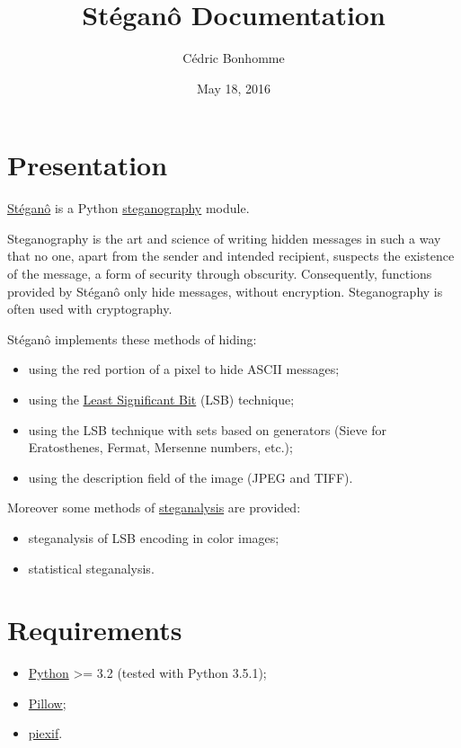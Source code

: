 \documentclass[letterpaper,10pt,english]{sphinxmanual}
\title{Stéganô Documentation}
\date{May 18, 2016}
\author{Cédric Bonhomme}
\begin{document}
\maketitle
\tableofcontents
{}\label{index::doc}



\chapter{Presentation}
\label{index:presentation}\label{index:welcome-to-stegano-s-documentation}
\href{https://github.com/cedricbonhomme/Stegano}{Stéganô} is a Python \href{http://en.wikipedia.org/wiki/Steganography}{steganography} module.

Steganography is the art and science of writing hidden messages in such a way
that no one, apart from the sender and intended recipient, suspects the
existence of the message, a form of security through obscurity.
Consequently, functions provided by Stéganô only hide messages,
without encryption. Steganography is often used with cryptography.

Stéganô implements these methods of hiding:
\begin{itemize}
\item {} 
using the red portion of a pixel to hide ASCII messages;

\item {} 
using the \href{http://en.wikipedia.org/wiki/Least\_significant\_bit}{Least Significant Bit} (LSB) technique;

\item {} 
using the LSB technique with sets based on generators (Sieve for Eratosthenes, Fermat, Mersenne numbers, etc.);

\item {} 
using the description field of the image (JPEG and TIFF).

\end{itemize}

Moreover some methods of \href{http://en.wikipedia.org/wiki/Steganalysis}{steganalysis} are provided:
\begin{itemize}
\item {} 
steganalysis of LSB encoding in color images;

\item {} 
statistical steganalysis.

\end{itemize}


\chapter{Requirements}
\label{index:requirements}\begin{itemize}
\item {} 
\href{https://www.python.org}{Python} \textgreater{}= 3.2 (tested with Python 3.5.1);

\item {} 
\href{https://pypi.python.org/pypi/Pillow}{Pillow};

\item {} 
\href{https://pypi.python.org/pypi/piexif}{piexif}.

\end{itemize}
\end{document}
